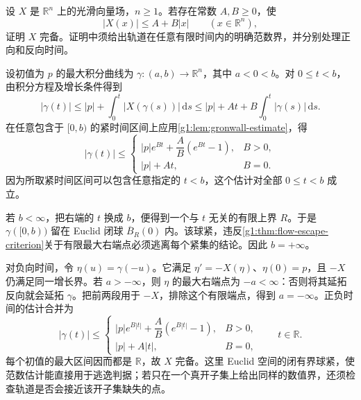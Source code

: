 \begin{exercise}\label{g1:ex:linear-growth-completeness}
	设 \(X\) 是 \(\mathbb R^n\) 上的光滑向量场，\(n\geq1\)。若存在常数 \(A,B\geq0\)，使
	\[
		|X(x)|\leq A+B|x|\qquad(x\in\mathbb R^n),
	\]
	证明 \(X\) 完备。证明中须给出轨道在任意有限时间内的明确范数界，并分别处理正向和反向时间。
\end{exercise}
\begin{solution}
	设初值为 \(p\) 的最大积分曲线为 \(\gamma:(a,b)\to\mathbb R^n\)，其中 \(a<0<b\)。对 \(0\leq t<b\)，由积分方程及增长条件得到
	\[
		|\gamma(t)|\leq|p|+\int_0^t|X(\gamma(s))|\,\mathrm{d}s
		\leq|p|+At+B\int_0^t|\gamma(s)|\,\mathrm{d}s.
	\]
	在任意包含于 \([0,b)\) 的紧时间区间上应用\cref{g1:lem:gronwall-estimate}，得
	\[
		|\gamma(t)|\leq
		\begin{cases}
			|p|e^{Bt}+\dfrac AB(e^{Bt}-1),&B>0,\\
			|p|+At,&B=0.
		\end{cases}
	\]
	因为所取紧时间区间可以包含任意指定的 \(t<b\)，这个估计对全部 \(0\leq t<b\) 成立。

	若 \(b<\infty\)，把右端的 \(t\) 换成 \(b\)，便得到一个与 \(t\) 无关的有限上界 \(R\)。于是 \(\gamma([0,b))\) 留在 Euclid 闭球 \(\overline B_R(0)\) 内。该球紧，违反\cref{g1:thm:flow-escape-criterion}关于有限最大右端点必须逃离每个紧集的结论。因此 \(b=+\infty\)。

	对负向时间，令 \(\eta(u)=\gamma(-u)\)。它满足 \(\eta'=-X(\eta)\)、\(\eta(0)=p\)，且 \(-X\) 仍满足同一增长界。若 \(a> -\infty\)，则 \(\eta\) 的最大右端点为 \(-a<\infty\)：否则将其延拓反向就会延拓 \(\gamma\)。把前两段用于 \(-X\)，排除这个有限端点，得到 \(a=-\infty\)。正负时间的估计合并为
	\[
		|\gamma(t)|\leq
		\begin{cases}
			|p|e^{B|t|}+\dfrac AB(e^{B|t|}-1),&B>0,\\
			|p|+A|t|,&B=0,
		\end{cases}
		\qquad t\in\mathbb R.
	\]
	每个初值的最大区间因而都是 \(\mathbb R\)，故 \(X\) 完备。这里 Euclid 空间的闭有界球紧，使范数估计能直接用于逃逸判据；若只在一个真开子集上给出同样的数值界，还须检查轨道是否会接近该开子集缺失的点。
\end{solution}

